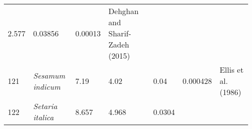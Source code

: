 \documentclass[]{article}
\begin{document}
\begin{longtable}[]{@{}lllllll@{}}
\begin{minipage}[t]{0.08\columnwidth}
2.577\strut
\end{minipage} & \begin{minipage}[t]{0.08\columnwidth}\raggedright
0.03856\strut
\end{minipage} & \begin{minipage}[t]{0.08\columnwidth}\raggedright
0.00013\strut
\end{minipage} & \begin{minipage}[t]{0.23\columnwidth}\raggedright
Dehghan and Sharif-Zadeh (2015)\strut
\end{minipage}\tabularnewline
\begin{minipage}[t]{0.05\columnwidth}\raggedright
121\strut
\end{minipage} & \begin{minipage}[t]{0.23\columnwidth}\raggedright
\emph{Sesamum indicum}\strut
\end{minipage} & \begin{minipage}[t]{0.05\columnwidth}\raggedright
7.19\strut
\end{minipage} & \begin{minipage}[t]{0.08\columnwidth}\raggedright
4.02\strut
\end{minipage} & \begin{minipage}[t]{0.08\columnwidth}\raggedright
0.04\strut
\end{minipage} & \begin{minipage}[t]{0.08\columnwidth}\raggedright
0.000428\strut
\end{minipage} & \begin{minipage}[t]{0.23\columnwidth}\raggedright
Ellis et al. (1986)\strut
\end{minipage}\tabularnewline
\begin{minipage}[t]{0.05\columnwidth}\raggedright
122\strut
\end{minipage} & \begin{minipage}[t]{0.23\columnwidth}\raggedright
\emph{Setaria italica}\strut
\end{minipage} & \begin{minipage}[t]{0.05\columnwidth}\raggedright
8.657\strut
\end{minipage} & \begin{minipage}[t]{0.08\columnwidth}\raggedright
4.968\strut
\end{minipage} & \begin{minipage}[t]{0.08\columnwidth}\raggedright
0.0304\strut
\end{minipage} & \begin{minipage}[t]{0.08\columnwidth}\raggedright

\end{minipage}
\end{longtable}
\end{document}
